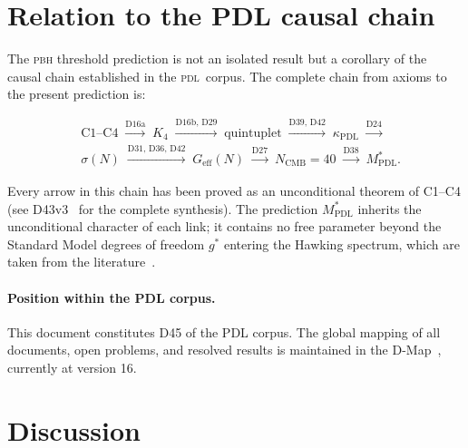 \documentclass[12pt, a4paper]{article}
\theoremstyle{definition}
\newcommand{\PDL}{\textsc{pdl}}
\newcommand{\Geff}{G_{\mathrm{eff}}}
\newcommand{\sigN}{\sigma(N)}
\newcommand{\kappaPDL}{\kappa_{\mathrm{PDL}}}
\newcommand{\MstarPDL}{M^{*}_{\mathrm{PDL}}}
\begin{document}
\section{Relation to the PDL causal chain}

The \textsc{pbh} threshold prediction is not an isolated result but a corollary of the causal chain established in the \PDL\ corpus. The complete chain from axioms to the present prediction is:

\begin{equation*}
\begin{split}
  &\mathrm{C1\text{--}C4}
  \;\xrightarrow{\text{D16a}}\; K_4
  \;\xrightarrow{\text{D16b, D29}}\; \text{quintuplet}
  \;\xrightarrow{\text{D39, D42}}\; \kappaPDL 
  \;\xrightarrow{\text{D24}}\; \\ &\sigN
  \;\xrightarrow{\text{D31, D36, D42}}\; \Geff(N)
  \;\xrightarrow{\text{D27}}\; N_{\mathrm{CMB}}=40
  \;\xrightarrow{\text{D38}}\; \MstarPDL.
\end{split}
\end{equation*}

Every arrow in this chain has been proved as an unconditional theorem of C1--C4 (see D43v3~\cite{D43v3} for the complete synthesis). The prediction $\MstarPDL$ inherits the unconditional character of each link; it contains no free parameter beyond the Standard Model degrees of freedom $g^*$ entering the Hawking spectrum, which are taken from the literature~\cite{Carr2021}.

\paragraph{Position within the PDL corpus.} This document constitutes D45 of the PDL corpus. The global mapping of all documents, open problems, and resolved results is maintained in the D-Map~\cite{DM}, currently at version 16.

\section{Discussion}
\label{sec:discussion}
\end{document}

